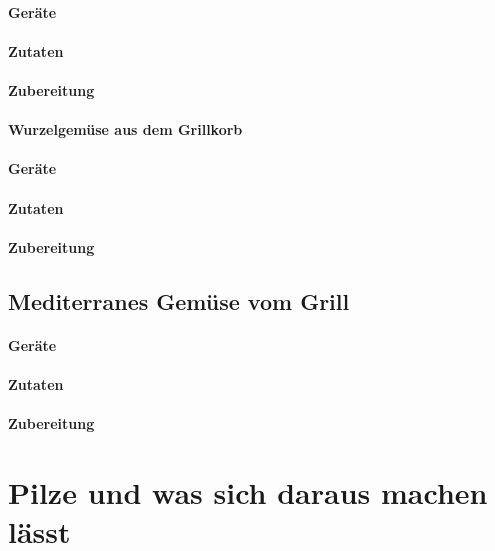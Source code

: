 \paragraph{Geräte}

\paragraph{Zutaten}

\paragraph{Zubereitung}

\paragraph{Wurzelgemüse aus dem Grillkorb}

\paragraph{Geräte}

\paragraph{Zutaten}

\paragraph{Zubereitung}

\subsection{Mediterranes Gemüse vom Grill}

\paragraph{Geräte}

\paragraph{Zutaten}

\paragraph{Zubereitung}



\section{Pilze und was sich daraus machen lässt}

